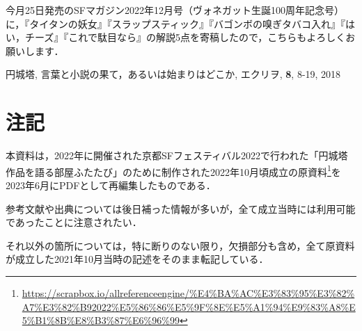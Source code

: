\documentclass[10pt, a5paper, twoside]{jsarticle}
\theoremstyle{definition}
\begin{document}
		今月25日発売のSFマガジン2022年12月号（ヴォネガット生誕100周年記念号）に，『タイタンの妖女』『スラップスティック』『バゴンボの嗅ぎタバコ入れ』『はい，チーズ』『これで駄目なら』の解説5点を寄稿したので，こちらもよろしくお願いします．

	\begin{thebibliography}{99}

		 円城塔, 言葉と小説の果て，あるいは始まりはどこか, エクリヲ, \textbf{8}, 8-19, 2018

	\end{thebibliography}

	\clearpage

	\section*{注記}

		本資料は，2022年に開催された京都SFフェスティバル2022で行われた「円城塔作品を語る部屋ふたたび」のために制作された2022年10月頃成立の原資料\footnote{\url{https://scrapbox.io/allreferenceengine/%E4%BA%AC%E3%83%95%E3%82%A7%E3%82%B92022%E5%86%86%E5%9F%8E%E5%A1%94%E9%83%A8%E5%B1%8B%E8%B3%87%E6%96%99}}を2023年6月にPDFとして再編集したものである．

		参考文献や出典については後日補った情報が多いが，全て成立当時には利用可能であったことに注意されたい．

		それ以外の箇所については，特に断りのない限り，欠損部分も含め，全て原資料が成立した2021年10月当時の記述をそのまま転記している．
\end{document}
